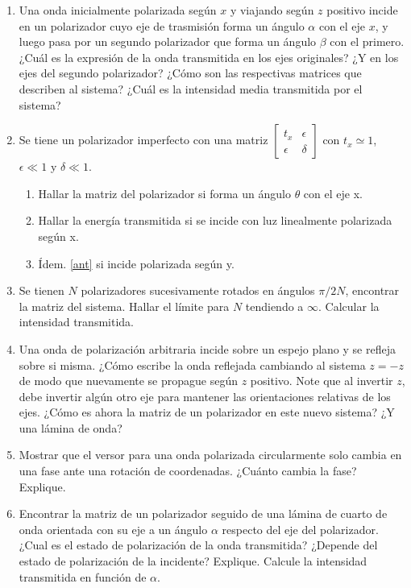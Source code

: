 \documentclass[11pt,spanish,a4paper]{article}
\begin{document}
\begin{enumerate}

\item Una onda inicialmente polarizada según \(x\) y viajando según \(z\) positivo incide en un polarizador cuyo eje de trasmisión forma un ángulo \(\alpha\) con el eje \(x\), y luego pasa por un segundo polarizador que forma un ángulo \(\beta\) con el primero.
¿Cuál es la expresión de la onda transmitida en los ejes originales?
¿Y en los ejes del segundo polarizador?
¿Cómo son las respectivas matrices que describen al sistema?
¿Cuál es la intensidad media transmitida por el sistema?


\item Se tiene un polarizador imperfecto con una matriz
\(
	\begin{bmatrix}
		t_x  & \epsilon \\
		\epsilon & \delta
	\end{bmatrix}
\)
con \(t_x \simeq 1\), \(\epsilon \ll 1 \) y \(\delta \ll 1 \).
\begin{enumerate}
	\item Hallar la matriz del polarizador si forma un ángulo \(\theta \) con el eje x.
	\item \label{ant} Hallar la energía transmitida si se incide con luz linealmente polarizada según x.
	\item Ídem. \ref{ant} si incide polarizada según y.
\end{enumerate}


\item Se tienen \(N\) polarizadores sucesivamente rotados en ángulos \(\pi/ 2N\), encontrar la matriz del sistema.
Hallar el límite para \(N\) tendiendo a \(\infty\).
Calcular la intensidad transmitida.


\item Una onda de polarización arbitraria incide sobre un espejo plano y se refleja sobre si misma.
¿Cómo escribe la onda reflejada cambiando al sistema \(z= -z\) de modo que nuevamente se propague según \(z\) positivo.
Note que al invertir \(z\), debe invertir algún otro eje para mantener las orientaciones relativas de los ejes.
¿Cómo es ahora la matriz de un polarizador en este nuevo sistema?
¿Y una lámina de onda?


\item Mostrar que el versor para una onda polarizada circularmente solo cambia en una fase ante una rotación de coordenadas.
¿Cuánto cambia la fase?
Explique.


\item Encontrar la matriz de un polarizador seguido de una lámina de cuarto de onda orientada con su eje a un ángulo \( \alpha \) respecto del eje del polarizador.
¿Cual es el estado de polarización de la onda transmitida?
¿Depende del estado de polarización de la incidente?
Explique.
Calcule la intensidad transmitida en función de \( \alpha \).



\end{enumerate}
\end{document}
